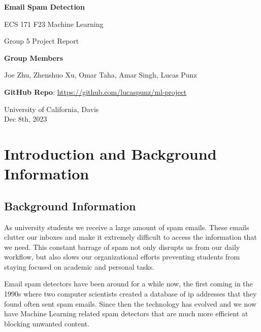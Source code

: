 \documentclass[conference]{IEEEtran}
\begin{document}
\begin{titlepage}
    \begin{center}
        \vspace*{1cm}
 
        \textbf{Email Spam Detection}
 
        \vspace{0.5cm}
        ECS 171 F23 Machine Learning

        Group 5 Project Report
             
        \vspace{1.5cm}
 
        \textbf{Group Members}

        Joe Zhu, Zhenshuo Xu, Omar Taha, Amar Singh, Lucas Punz

        \vspace{0.5cm}
        \textbf{GitHub Repo}: \url{https://github.com/lucaspunz/ml-project}
             
        \vspace{1.5cm}
        
 
        \vfill
             
        University of California, Davis\\
        Dec 8th, 2023
    \end{center}
\end{titlepage}

\newpage
\section*{Introduction and Background Information}
\subsection{\textbf{Background Information}}
As university students we receive a large amount of spam emails. These emails clutter our inboxes and make it extremely difficult to access the information that we need. This constant barrage of spam not only disrupts us from our daily workflow, but also slows our organizational efforts preventing students from staying focused on academic and personal tasks. 

Email spam detectors have been around for a while now, the first coming in the 1990s where two computer scientists created a database of ip addresses that they found often sent spam emails. Since then the technology has evolved and we now have Machine Learning related spam detectors that are much more efficient at blocking unwanted content. 
\end{document}
